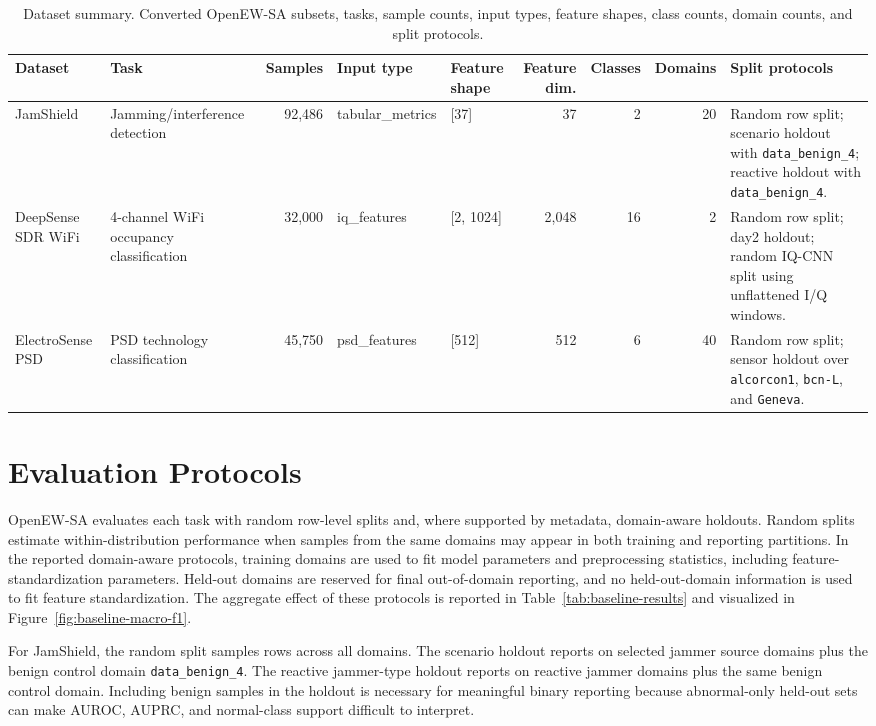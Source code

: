 \documentclass{ieeeaccess}
\newcommand{\artifact}[1]{\texttt{#1}}
\begin{document}
\begin{table}[t]
  \centering
  \scriptsize
  \setlength{\tabcolsep}{3pt}
  \renewcommand{\arraystretch}{1.18}
  \caption{Dataset summary. Converted OpenEW-SA subsets, tasks, sample counts, input types, feature shapes, class counts, domain counts, and split protocols.}
  \label{tab:dataset-summary}
  \begin{tabularx}{\textwidth}{L{0.12\textwidth} L{0.18\textwidth} r L{0.10\textwidth} L{0.09\textwidth} r r r Y}
    \toprule
    Dataset & Task & Samples & Input type & Feature shape & Feature dim. & Classes & Domains & Split protocols \\
    \midrule
    JamShield & Jamming/interference detection & 92,486 & tabular\_metrics & [37] & 37 & 2 & 20 & Random row split; scenario holdout with \artifact{data\_benign\_4}; reactive holdout with \artifact{data\_benign\_4}. \\
    DeepSense SDR WiFi & 4-channel WiFi occupancy classification & 32,000 & iq\_features & [2, 1024] & 2,048 & 16 & 2 & Random row split; day2 holdout; random IQ-CNN split using unflattened I/Q windows. \\
    ElectroSense PSD & PSD technology classification & 45,750 & psd\_features & [512] & 512 & 6 & 40 & Random row split; sensor holdout over \artifact{alcorcon1}, \artifact{bcn-L}, and \artifact{Geneva}. \\
    \bottomrule
  \end{tabularx}
\end{table}

\section{Evaluation Protocols}

OpenEW-SA evaluates each task with random row-level splits and, where supported by metadata, domain-aware holdouts. Random splits estimate within-distribution performance when samples from the same domains may appear in both training and reporting partitions. In the reported domain-aware protocols, training domains are used to fit model parameters and preprocessing statistics, including feature-standardization parameters. Held-out domains are reserved for final out-of-domain reporting, and no held-out-domain information is used to fit feature standardization. The aggregate effect of these protocols is reported in Table~\ref{tab:baseline-results} and visualized in Figure~\ref{fig:baseline-macro-f1}.

For JamShield, the random split samples rows across all domains. The scenario holdout reports on selected jammer source domains plus the benign control domain \artifact{data\_benign\_4}. The reactive jammer-type holdout reports on reactive jammer domains plus the same benign control domain. Including benign samples in the holdout is necessary for meaningful binary reporting because abnormal-only held-out sets can make AUROC, AUPRC, and normal-class support difficult to interpret.
\end{document}
